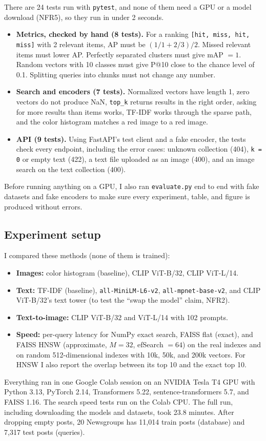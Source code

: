 \documentclass{article}
\begin{document}
There are 24 tests run with \texttt{pytest}, and none of them need a GPU or a model download (NFR5), so they run in under 2 seconds.
\begin{itemize}
  \item \textbf{Metrics, checked by hand (8 tests).} For a ranking \texttt{[hit, miss, hit, miss]} with 2 relevant items, AP must be $(1/1 + 2/3)/2$. Missed relevant items must lower AP. Perfectly separated clusters must give mAP $= 1$. Random vectors with 10 classes must give P@10 close to the chance level of 0.1. Splitting queries into chunks must not change any number.
  \item \textbf{Search and encoders (7 tests).} Normalized vectors have length 1, zero vectors do not produce NaN, \texttt{top\_k} returns results in the right order, asking for more results than items works, TF-IDF works through the sparse path, and the color histogram matches a red image to a red image.
  \item \textbf{API (9 tests).} Using FastAPI's test client and a fake encoder, the tests check every endpoint, including the error cases: unknown collection (404), \texttt{k = 0} or empty text (422), a text file uploaded as an image (400), and an image search on the text collection (400).
\end{itemize}
Before running anything on a GPU, I also ran \texttt{evaluate.\allowbreak py} end to end with fake datasets and fake encoders to make sure every experiment, table, and figure is produced without errors.

\subsection{Experiment setup}

I compared these methods (none of them is trained):
\begin{itemize}
  \item \textbf{Images:} color histogram (baseline), CLIP ViT-B/32, CLIP ViT-L/14.
  \item \textbf{Text:} TF-IDF (baseline), \texttt{all-MiniLM-L6-v2}, \texttt{all-mpnet-base-v2}, and CLIP ViT-B/32's text tower (to test the ``swap the model'' claim, NFR2).
  \item \textbf{Text-to-image:} CLIP ViT-B/32 and ViT-L/14 with 102 prompts.
  \item \textbf{Speed:} per-query latency for NumPy exact search, FAISS flat (exact), and FAISS HNSW (approximate, $M=32$, efSearch $=64$) on the real indexes and on random 512-dimensional indexes with 10k, 50k, and 200k vectors. For HNSW I also report the overlap between its top 10 and the exact top 10.
\end{itemize}
Everything ran in one Google Colab session on an NVIDIA Tesla T4 GPU with Python 3.13, PyTorch 2.14, Transformers 5.22, sentence-transformers 5.7, and FAISS 1.16. The search speed tests run on the Colab CPU. The full run, including downloading the models and datasets, took 23.8 minutes. After dropping empty posts, 20 Newsgroups has 11,014 train posts (database) and 7,317 test posts (queries).
\end{document}
